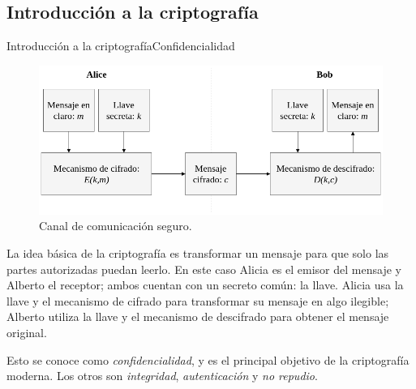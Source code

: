 %
%
%

\subsection{Introducción a la criptografía}

\begin{frame}{Introducción a la criptografía}{Confidencialidad}

  \begin{figure}[H]
    \begin{center}
      \includegraphics[width=1.0\linewidth]
        {../../../diagramas_comunes/marco_teorico/cripto_simetrica.png}
      \caption{Canal de comunicación seguro.}
    \end{center}
  \end{figure}

  \note
  {
    La idea básica de la criptografía es transformar un mensaje para que solo
    las partes autorizadas puedan leerlo. En este caso Alicia es el emisor del
    mensaje y Alberto el receptor; ambos cuentan con un secreto común: la llave.
    Alicia usa la llave y el mecanismo de cifrado para transformar su mensaje en
    algo ilegible; Alberto utiliza la llave y el mecanismo de descifrado para
    obtener el mensaje original.

    Esto se conoce como \textit{confidencialidad}, y es el principal objetivo de
    la criptografía moderna. Los otros son \textit{integridad},
    \textit{autenticación} y \textit{no repudio}.
  }

\end{frame}

